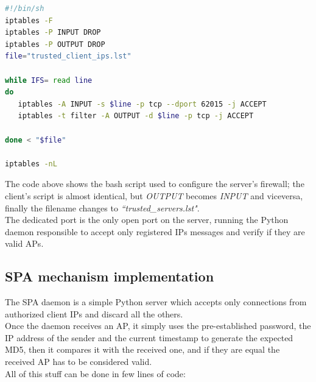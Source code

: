 \documentclass[12pt]{report}
\begin{document}
{\clearpage
\begin{center}
  \lstset{%
    caption=Server's firewall configuration script,
    basicstyle=\ttfamily\small\bfseries,
    frame=tb
  }
  
\begin{lstlisting}[language=bash]
#!/bin/sh
iptables -F
iptables -P INPUT DROP
iptables -P OUTPUT DROP
file="trusted_client_ips.lst"

while IFS= read line
do
   iptables -A INPUT -s $line -p tcp --dport 62015 -j ACCEPT
   iptables -t filter -A OUTPUT -d $line -p tcp -j ACCEPT

done < "$file"

iptables -nL
\end{lstlisting}
\end{center}

The code above shows the bash script used to configure the server's firewall; the client's script is almost identical, but \emph{OUTPUT} becomes \emph{INPUT} and viceversa, finally the filename changes to \emph{``trusted\_servers.lst"}.\\


The dedicated port is the only open port on the server, running the Python daemon responsible to accept only registered IPs messages and verify if they are valid APs.\\

\subsection{SPA mechanism implementation}
\bigskip

The SPA daemon is a simple Python server which accepts only connections from authorized client IPs and discard all the others.\\

Once the daemon receives an AP, it simply uses the pre-established password, the IP address of the sender and the current timestamp to generate the expected MD5, then it compares it with the received one, and if they are equal the received AP has to be considered valid.\\
All of this stuff can be done in few lines of code:\\

\begin{python}


\end{python}}
\end{document}
